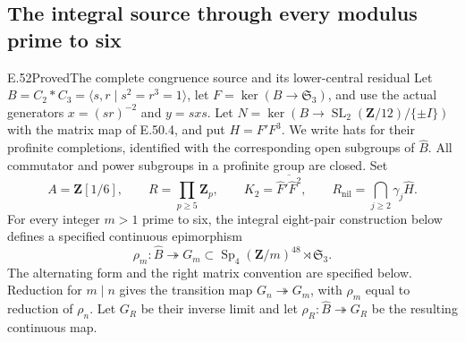 \subsection{The integral source through every modulus prime to six}

\begin{statement}{E.52}{Proved}{The complete congruence source and its lower-central residual}
Let $B=C_2*C_3=\langle s,r\mid s^2=r^3=1\rangle$,
let $F=\ker(B\to\mathfrak S_3)$, and use the actual
generators $x=(sr)^{-2}$ and $y=sxs$.
Let $N=\ker(B\to\operatorname{SL}_2(\mathbf Z/12)/\{\pm I\})$
with the matrix map of E.50.4, and put $H=F'F^3$.
We write hats for their profinite completions, identified
with the corresponding open subgroups of $\widehat B$.
All commutator and power subgroups in a profinite group
are closed. Set
\[
 A=\mathbf Z[1/6],\qquad
 R=\prod_{p\geq5}\mathbf Z_p,\qquad
 K_2=\overline{\widehat F'\widehat F^2},\qquad
 R_{\mathrm{nil}}=\bigcap_{j\geq2}\gamma_j\widehat H.
 \tag{E.52.1}
\]
For every integer $m>1$ prime to six, the integral
eight-pair construction below defines a specified
continuous epimorphism
\[
 \rho_m:\widehat B\twoheadrightarrow G_m
   \subset\operatorname{Sp}_4(\mathbf Z/m)^{48}
                         \rtimes\mathfrak S_3.
 \tag{E.52.2}
\]
The alternating form and the right matrix convention
are specified below. Reduction for $m\mid n$ gives
the transition map $G_n\twoheadrightarrow G_m$,
with $\rho_m$ equal to reduction of $\rho_n$.
Let $G_R$ be their inverse limit and let
$\rho_R:\widehat B\twoheadrightarrow G_R$ be the
resulting continuous map.


\end{statement}
